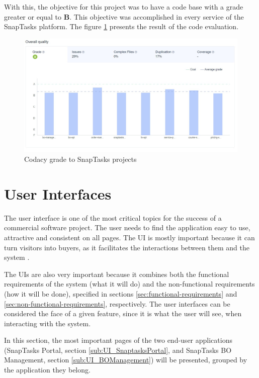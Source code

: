With this, the objective for this project was to have a code base with a grade greater or equal to \textbf{B}. This objective was accomplished in every service of the SnapTasks platform. The figure \ref{fig:codacyGrade} presents the result of the code evaluation.


\begin{figure}[!ht]
\centering
\includegraphics[width=\textwidth,keepaspectratio]{chapters/Implementation/assets/codacy-grade.jpg}
\caption[Codacy grade to SnapTasks projects]{Codacy grade to SnapTasks projects}
\label{fig:codacyGrade}
\end{figure}


\section{User Interfaces}
The user interface is one of the most critical topics for the success of a commercial software project. The user needs to find the application easy to use, attractive and consistent on all pages. The \gls{UI} is mostly important because it can turn visitors into buyers, as it facilitates the interactions between them and the system \parencite{uiDesignImportance}.
\par
The \gls{UI}s are also very important because it combines both the functional requirements of the system (what it will do) and the non-functional requirements (how it will be done), specified in sections \ref{sec:functional-requirements} and \ref{sec:non-functional-requirements}, respectively. The user interfaces can be considered the face of a given feature, since it is what the user will see, when interacting with the system.
\par
In this section, the most important pages of the two end-user applications (SnapTasks Portal, section \ref{sub:UI_SnaptasksPortal}, and SnapTasks BO Management, section \ref{sub:UI_BOManagement}) will be presented, grouped by the application they belong.


